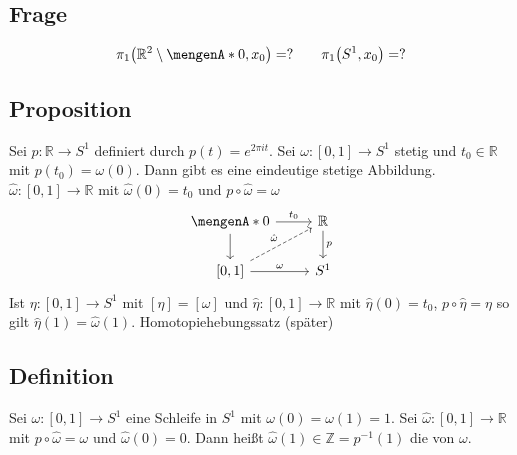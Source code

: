 \subsection{Frage} %
\label{sub:101}
\[
	\pi_1 \enbrace*{\mathds{R}^2 \setminus \set{0}, x_0 } = ? \qquad \pi_1 \enbrace*{S^1, x_0} = ?  
\]

\subsection[Proposition: Hebung eines Weges auf $S^1$ nach $\mathds{R}$]{Proposition} %
\label{sub:102}
Sei $p  : \mathds{R} \to S^1$ definiert durch $p(t) = e^{2 \pi i t}$. Sei $\omega : [0,1] \to S^1$ stetig und $t_0 \in \mathds{R}$ mit $p(t_0) = \omega(0)$.
Dann gibt es eine eindeutige stetige Abbildung. $\hat{\omega} : [0,1] \to \mathds{R}$ mit $\hat{\omega}(0) = t_0$ und $p  \circ  \hat{\omega} = \omega$
\[
	\begin{tikzcd}
		\set{0} \rar{t_0} \dar& \mathds{R} \dar{p} \\
		{[0,1]} \rar{\omega} \urar[dashed]{\hat{\omega}}& S^1 
	\end{tikzcd}
\]
Ist $\eta : [0,1] \to S^1$ mit $[\eta] = [\omega]$ und $\hat{\eta} : [0,1] \to \mathds{R}$ mit $\hat{\eta}(0)= t_0$, $p \circ \hat{\eta} = \eta$ so gilt 
$\hat{\eta}(1) = \hat{\omega}(1)$.
Homotopiehebungssatz (später) \bewende

\subsection[Definition: Windungszahl]{Definition} %
\label{sub:103}
Sei $\omega : [0,1] \to S^1$ eine Schleife in $S^1$ mit $\omega(0) = \omega(1) = 1$. Sei $\hat{\omega} : [0,1] \to \mathds{R}$ mit $p \circ  \hat{\omega} = \omega$ und
$\hat{\omega}(0)=0$. Dann heißt $\hat{\omega}(1) \in \mathds{Z} = p^{-1}(1)$ die  von $\omega$. 

